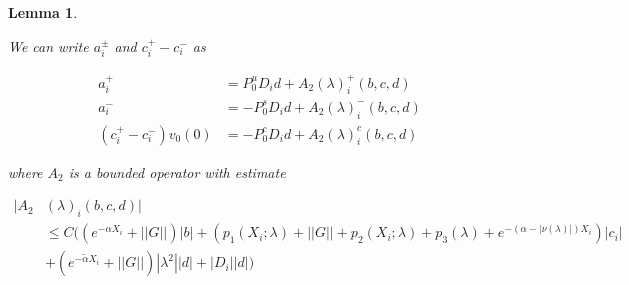 \documentclass[12pt]{article}
\newtheorem{lemma}{Lemma}
\begin{document}
\begin{lemma}\label{inv2}







We can write $a_i^\pm$ and $c_i^+ - c_i^-$ as 

\begin{align*}
a_i^+ &= P^u_0 D_i d + A_2(\lambda)_i^+(b, c, d) \\
a_i^- &= -P^s_0 D_i d + A_2(\lambda)_i^-(b, c, d) \\
(c_i^+ - c_i^-)v_0(0) &= -P^c_0 D_i d + A_2(\lambda)_i^c(b, c, d)
\end{align*}

where $A_2$ is a bounded operator with estimate

\begin{align*}
|A_2&(\lambda)_i(b, c, d)| \\
&\leq C \Big( (e^{-\alpha X_i} + ||G||)|b| + (p_1(X_i; \lambda) + ||G|| + p_2(X_i; \lambda) + p_3(\lambda) + e^{-(\alpha - |\nu(\lambda)|)X_i})|c_i| \\
&+ (e^{-\tilde{\alpha} X_i} + ||G||) |\lambda^2| |d| + |D_i||d|\Big)
\end{align*}


\end{lemma}
\end{document}
